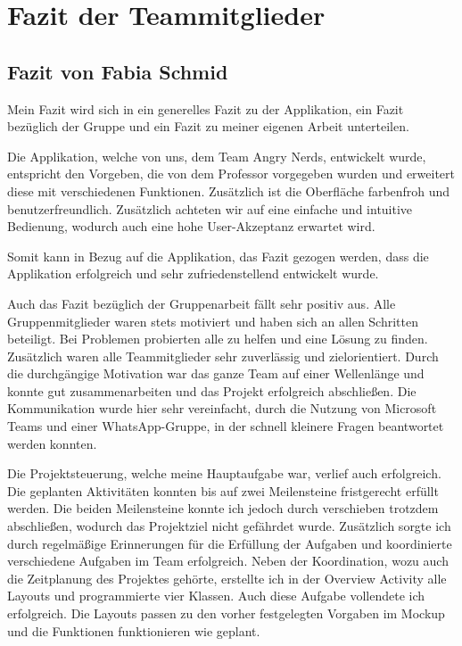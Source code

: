 \section{Fazit der Teammitglieder}
\label{instal}

\subsection{Fazit von Fabia Schmid}

Mein Fazit wird sich in ein generelles Fazit zu der Applikation, ein Fazit bezüglich der Gruppe und ein Fazit zu meiner eigenen Arbeit unterteilen.

Die Applikation, welche von uns, dem Team Angry Nerds, entwickelt wurde, entspricht den Vorgeben, die von dem Professor vorgegeben wurden und erweitert diese mit verschiedenen Funktionen. Zusätzlich ist die Oberfläche farbenfroh und benutzerfreundlich. Zusätzlich achteten wir auf eine einfache und intuitive Bedienung, wodurch auch eine hohe User-Akzeptanz erwartet wird.

Somit kann in Bezug auf die Applikation, das Fazit gezogen werden, dass die Applikation erfolgreich und sehr zufriedenstellend entwickelt wurde.

Auch das Fazit bezüglich der Gruppenarbeit fällt sehr positiv aus. Alle Gruppenmitglieder waren stets motiviert und haben sich an allen Schritten beteiligt. Bei Problemen probierten alle zu helfen und eine Lösung zu finden. Zusätzlich waren alle Teammitglieder sehr zuverlässig und zielorientiert. Durch die durchgängige Motivation war das ganze Team auf einer Wellenlänge und konnte gut zusammenarbeiten und das Projekt erfolgreich abschließen. Die Kommunikation wurde hier sehr vereinfacht, durch die Nutzung von Microsoft Teams und einer WhatsApp-Gruppe, in der schnell kleinere Fragen beantwortet werden konnten.

Die Projektsteuerung, welche meine Hauptaufgabe war, verlief auch erfolgreich. Die geplanten Aktivitäten konnten bis auf zwei Meilensteine fristgerecht erfüllt werden. Die beiden Meilensteine konnte ich jedoch durch verschieben trotzdem abschließen, wodurch das Projektziel nicht gefährdet wurde. Zusätzlich sorgte ich durch regelmäßige Erinnerungen für die Erfüllung der Aufgaben und koordinierte verschiedene Aufgaben im Team erfolgreich. Neben der Koordination, wozu auch die Zeitplanung des Projektes gehörte, erstellte ich in der Overview Activity alle Layouts und programmierte vier Klassen. Auch diese Aufgabe vollendete ich erfolgreich. Die Layouts passen zu den vorher festgelegten Vorgaben im Mockup und die Funktionen funktionieren wie geplant.

